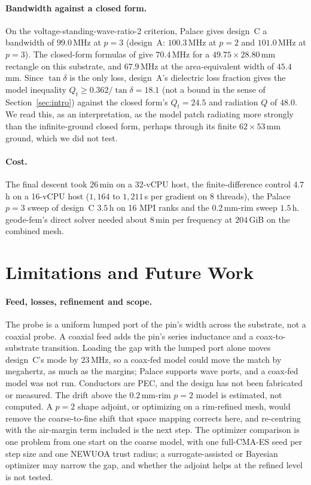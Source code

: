 \documentclass{anvil-paper}
\begin{document}
\paragraph{Bandwidth against a closed form.}
On the voltage-standing-wave-ratio-2 criterion, Palace gives design~C a
bandwidth of $99.0$\,MHz at $p = 3$ (design~A: $100.3$\,MHz at $p = 2$ and
$101.0$\,MHz at $p = 3$). The closed-form formulas of
\citet{jackson1991simple} give $70.4$\,MHz for a $49.75\times28.80$\,mm
rectangle on this substrate, and $67.9$\,MHz at the area-equivalent width of
$45.4$\,mm. Since $\tan\delta$ is the only loss, design~A's dielectric
loss fraction gives the model inequality $Q_t \ge 0.362/\tan\delta = 18.1$
(not a bound in the sense of Section~\ref{sec:intro}) against the closed
form's $Q_t = 24.5$ and radiation $Q$ of $48.0$. We read this, as an
interpretation, as the model patch radiating more strongly than the
infinite-ground closed form, perhaps through its finite $62\times53$\,mm
ground, which we did not test.

\paragraph{Cost.}
The final descent took $26$\,min on a 32-vCPU host, the finite-difference
control $4.7$\,h on a 16-vCPU host ($1{,}164$ to $1{,}211$\,s per gradient on
8 threads), the Palace $p = 3$ sweep of design~C $3.5$\,h on 16 MPI ranks and
the $0.2$\,mm-rim sweep $1.5$\,h. geode-fem's direct solver needed about
$8$\,min per frequency at $204$\,GiB on the combined mesh.

\section{Limitations and Future Work}
\label{sec:limits}

\paragraph{Feed, losses, refinement and scope.}
The probe is a uniform lumped port of the pin's width across the substrate,
not a coaxial probe. A coaxial feed adds the pin's series inductance and a
coax-to-substrate transition. Loading the gap with the lumped port alone
moves design~C's mode by $23$\,MHz, so a coax-fed model could move the
match by megahertz, as much as the margins; Palace supports wave ports, and
a coax-fed model was not run. Conductors are PEC, and the design has not
been fabricated or measured.
The drift above the $0.2$\,mm-rim $p = 2$ model is estimated, not computed.
A $p = 2$ shape adjoint, or optimizing on a rim-refined mesh, would remove
the coarse-to-fine shift that space mapping corrects here, and re-centring
with the air-margin term included is the next step. The optimizer
comparison is one problem from one start on the coarse model, with one
full-CMA-ES seed per step size and one NEWUOA trust radius; a
surrogate-assisted or Bayesian optimizer may narrow the gap, and whether the
adjoint helps at the refined level is not tested.
\end{document}
